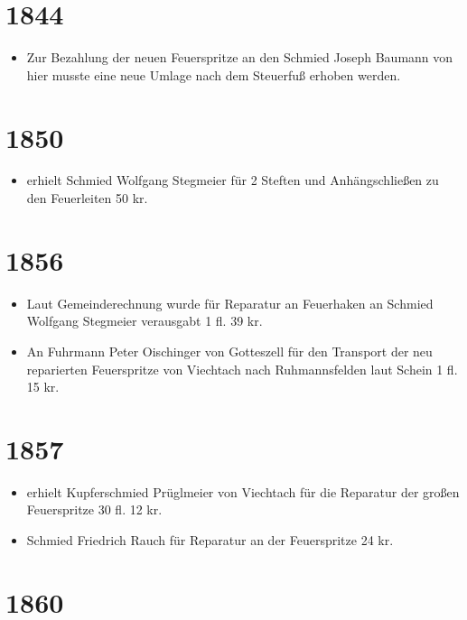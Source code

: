 \documentclass[12pt,a4paper]{book}
\begin{document}
\section*{1844}

\begin{itemize}
\item Zur Bezahlung der neuen Feuerspritze an den Schmied Joseph Baumann von hier
musste eine neue Umlage nach dem Steuerfuß erhoben werden.
\end{itemize}

\section*{1850}

\begin{itemize}
\item erhielt Schmied Wolfgang Stegmeier für 2 Steften und Anhängschließen zu
den Feuerleiten 50 kr.
\end{itemize}

\section*{1856}

\begin{itemize}
\item Laut Gemeinderechnung wurde für Reparatur an Feuerhaken an Schmied
Wolfgang Stegmeier verausgabt 1 fl. 39 kr.

\item An Fuhrmann Peter Oischinger von Gotteszell für den Transport der neu
reparierten Feuerspritze von Viechtach nach Ruhmannsfelden laut Schein 1 fl. 15
kr.
\end{itemize}

\section*{1857}

\begin{itemize}
\item erhielt Kupferschmied Prüglmeier von Viechtach für die Reparatur der
großen Feuerspritze 30 fl. 12 kr.

\item Schmied Friedrich Rauch für Reparatur an der Feuerspritze 24 kr.
\end{itemize}

\section*{1860}
\end{document}
